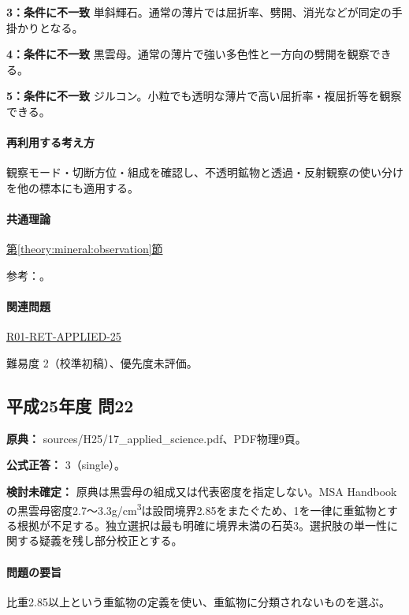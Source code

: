 \noindent\textbf{3：条件に不一致} 単斜輝石。通常の薄片では屈折率、劈開、消光などが同定の手掛かりとなる。\par

\noindent\textbf{4：条件に不一致} 黒雲母。通常の薄片で強い多色性と一方向の劈開を観察できる。\par

\noindent\textbf{5：条件に不一致} ジルコン。小粒でも透明な薄片で高い屈折率・複屈折等を観察できる。\par

\paragraph{再利用する考え方} 観察モード・切断方位・組成を確認し、不透明鉱物と透過・反射観察の使い分けを他の標本にも適用する。

\paragraph{共通理論} \hyperref[theory:mineral:observation]{第\ref*{theory:mineral:observation}節}

\par 参考：\cite{hom_pyrite}。

\paragraph{関連問題} \hyperref[q:r01-ret-applied-25]{R01-RET-APPLIED-25}

\par 難易度 2（校準初稿）、優先度未評価。

\subsection{平成25年度 問22}
\label{q:h25-reg-applied-22}

\noindent\textbf{原典：} sources/H25/17\_applied\_science.pdf、PDF物理9頁。

\textbf{公式正答：} 3（single）。

\par\textbf{検討未確定：} 原典は黒雲母の組成又は代表密度を指定しない。MSA Handbookの黒雲母密度2.7〜3.3g/cm\textsuperscript{3}は設問境界2.85をまたぐため、1を一律に重鉱物とする根拠が不足する。独立選択は最も明確に境界未満の石英3。選択肢の単一性に関する疑義を残し部分校正とする。

\paragraph{問題の要旨} 比重2.85以上という重鉱物の定義を使い、重鉱物に分類されないものを選ぶ。


